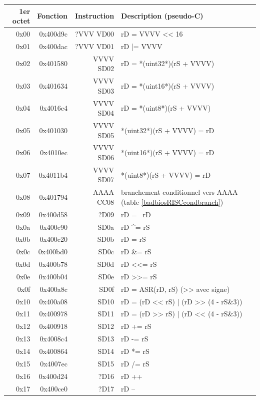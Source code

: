 \documentclass[a4paper,10pt]{article}
\newcommand{\lsl}[1]{\textless{}\textless{} #1} %
\newcommand{\lsr}[1]{\textgreater{}\textgreater{} #1} %
\begin{document}
\begin{table}[h]
\begin{center}
\begin{tabular}{|r|r|r|l|}
  \hline
  1er octet & Fonction & Instruction & Description (pseudo-C) \\
  \hline
  0x00 & 0x400d9c & ?VVV VD00 & rD = VVVV \lsl 16 \\
  0x01 & 0x400dac & ?VVV VD01 & rD |= VVVV \\
  0x02 & 0x401580 & VVVV SD02 & rD = *(uint32*)(rS + VVVV) \\
  0x03 & 0x401634 & VVVV SD03 & rD = *(uint16*)(rS + VVVV) \\
  0x04 & 0x4016e4 & VVVV SD04 & rD = *(uint8*)(rS + VVVV) \\
  0x05 & 0x401030 & VVVV SD05 & *(uint32*)(rS + VVVV) = rD \\
  0x06 & 0x4010ec & VVVV SD06 & *(uint16*)(rS + VVVV) = rD \\
  0x07 & 0x4011b4 & VVVV SD07 & *(uint8*)(rS + VVVV) = rD \\
  0x08 & 0x401794 & AAAA CC08 & branchement conditionnel vers AAAA (table \ref{badbiosRISCcondbranch})  \\
  0x09 & 0x400d58 &      ?D09 & rD = ~rD \\
  0x0a & 0x400c90 &      SD0a & rD \^{}= rS \\
  0x0b & 0x400c20 &      SD0b & rD \textbar{}= rS \\
  0x0c & 0x400bd0 &      SD0c & rD \&= rS \\
  0x0d & 0x400b78 &      SD0d & rD \textless{}\textless{}= rS \\
  0x0e & 0x400b04 &      SD0e & rD \textgreater{}\textgreater{}= rS \\
  0x0f & 0x400a8c &      SD0f & rD = ASR(rD, rS) (\lsr avec signe) \\
  0x10 & 0x400a08 &      SD10 & rD = (rD \lsl rS) | (rD \lsr (4 - rS\&3)) \\
  0x11 & 0x400978 &      SD11 & rD = (rD \lsr rS) | (rD \lsl (4 - rS\&3)) \\
  0x12 & 0x400918 &      SD12 & rD += rS \\
  0x13 & 0x4008c4 &      SD13 & rD -= rS \\
  0x14 & 0x400864 &      SD14 & rD *= rS \\
  0x15 & 0x4007ec &      SD15 & rD /= rS \\
  0x16 & 0x400d24 &      ?D16 & rD ++ \\
  0x17 & 0x400ce0 &      ?D17 & rD -- \\

\end{tabular}
\end{center}
\end{table}
\end{document}
